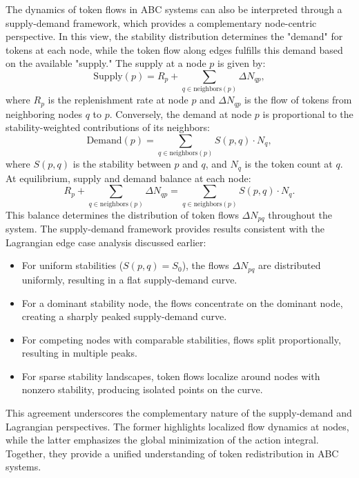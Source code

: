 \documentclass[entropy,article,submit,pdftex,oneauthor]{Definitions/mdpi}
\begin{document}
The dynamics of token flows in ABC systems can also be interpreted through a supply-demand framework, which provides a complementary node-centric perspective. In this view, the stability distribution determines the "demand" for tokens at each node, while the token flow along edges fulfills this demand based on the available "supply."  The supply at a node \(p\) is given by:
\begin{equation}
\text{Supply}(p) = R_p + \sum_{q \in \text{neighbors}(p)} \Delta N_{qp},
\end{equation}
where \(R_p\) is the replenishment rate at node \(p\) and \(\Delta N_{qp}\) is the flow of tokens from neighboring nodes \(q\) to \(p\). Conversely, the demand at node \(p\) is proportional to the stability-weighted contributions of its neighbors:
\begin{equation}
\text{Demand}(p) = \sum_{q \in \text{neighbors}(p)} S(p, q) \cdot N_q,
\end{equation}
where \(S(p, q)\) is the stability between \(p\) and \(q\), and \(N_q\) is the token count at \(q\). At equilibrium, supply and demand balance at each node:
\begin{equation}
R_p + \sum_{q \in \text{neighbors}(p)} \Delta N_{qp} = \sum_{q \in \text{neighbors}(p)} S(p, q) \cdot N_q.
\end{equation}
This balance determines the distribution of token flows \(\Delta N_{pq}\) throughout the system. The supply-demand framework provides results consistent with the Lagrangian edge case analysis discussed earlier:
\begin{itemize}
    \item[] For uniform stabilities (\(S(p, q) = S_0\)), the flows \(\Delta N_{pq}\) are distributed uniformly, resulting in a flat supply-demand curve.
    \item[] For a dominant stability node, the flows concentrate on the dominant node, creating a sharply peaked supply-demand curve.
    \item[] For competing nodes with comparable stabilities, flows split proportionally, resulting in multiple peaks.
    \item[] For sparse stability landscapes, token flows localize around nodes with nonzero stability, producing isolated points on the curve.
\end{itemize}

This agreement underscores the complementary nature of the supply-demand and Lagrangian perspectives. The former highlights localized flow dynamics at nodes, while the latter emphasizes the global minimization of the action integral. Together, they provide a unified understanding of token redistribution in ABC systems.
\end{document}
